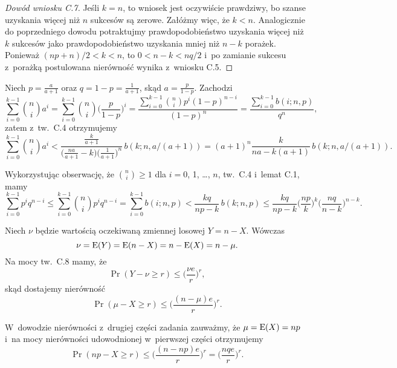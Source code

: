 \begin{proof}[Dowód wniosku C.7]
	Jeśli $k=n$, to wniosek jest oczywiście prawdziwy, bo szanse uzyskania więcej niż $n$ sukcesów są zerowe.
Załóżmy więc, że $k<n$.
Analogicznie do poprzedniego dowodu potraktujmy prawdopodobieństwo uzyskania więcej niż $k$ sukcesów jako prawdopodobieństwo uzyskania mniej niż $n-k$ porażek.
Ponieważ $(np+n)/2<k<n$, to $0<n-k<nq/2$ i~po zamianie sukcesu z~porażką postulowana nierówność wynika z~wniosku C.5.
\end{proof}

\exercise %

\noindent Niech $p=\frac{a}{a+1}$ oraz $q=1-p=\frac{1}{a+1}$, skąd $a=\frac{p}{1-p}$.
Zachodzi
\[
	\sum_{i=0}^{k-1}\binom{n}{i}a^i = \sum_{i=0}^{k-1}\binom{n}{i}\biggl(\frac{p}{1-p}\biggr)^i = \frac{\sum_{i=0}^{k-1}\binom{n}{i}p^i(1-p)^{n-i}}{(1-p)^n} = \frac{\sum_{i=0}^{k-1}b(i;n,p)}{q^n},
\]
zatem z~tw.\ C.4 otrzymujemy
\[
	\sum_{i=0}^{k-1}\binom{n}{i}a^i < \frac{\frac{k}{a+1}}{\bigl(\frac{na}{a+1}-k\bigr)\bigl(\frac{1}{a+1}\bigr)^n}\,b(k;n,a/(a+1)) = (a+1)^n\frac{k}{na-k(a+1)}\,b(k;n,a/(a+1)).
\]

\exercise %
Wykorzystując obserwację, że $\binom{n}{i}\ge1$ dla $i=0$, 1, \dots, $n$, tw.\ C.4 i~lemat C.1, mamy
\[
	\sum_{i=0}^{k-1}p^iq^{n-i} \le \sum_{i=0}^{k-1}\binom{n}{i}p^iq^{n-i} = \sum_{i=0}^{k-1}b(i;n,p) < \frac{kq}{np-k}\,b(k;n,p) \le \frac{kq}{np-k}\biggl(\frac{np}{k}\biggr)^k\biggl(\frac{nq}{n-k}\biggr)^{n-k}.
\]

\exercise %

\noindent Niech $\nu$ będzie wartością oczekiwaną zmiennej losowej $Y=n-X$.
Wówczas
\[
        \nu = \operatorname{E}(Y) = \operatorname{E}(n-X) = n-\operatorname{E}(X) = n-\mu.
\]
Na mocy tw.\ C.8 mamy, że
\[
        \Pr(Y-\nu\ge r) \le \biggl(\frac{\nu e}{r}\biggr)^r,
\]
skąd dostajemy nierówność
\[
        \Pr(\mu-X\ge r) \le \biggl(\frac{(n-\mu)e}{r}\biggr)^r.
\]

W~dowodzie nierówności z~drugiej części zadania zauważmy, że $\mu=\operatorname{E}(X)=np$ i~na mocy nierówności udowodnionej w~pierwszej części otrzymujemy
\[
    \Pr(np-X\ge r) \le \biggl(\frac{(n-np)e}{r}\biggr)^r = \biggl(\frac{nqe}{r}\biggr)^r.
\]

\exercise %

